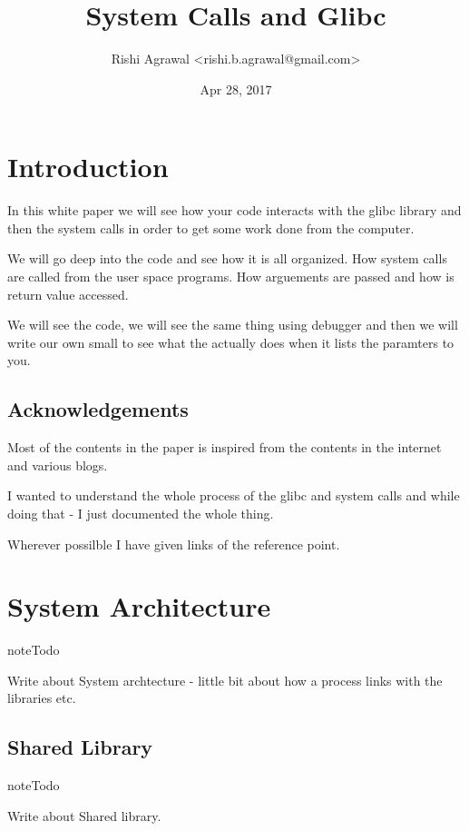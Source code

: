\documentclass[letterpaper,10pt,english]{sphinxmanual}
\title{System Calls and Glibc}
\date{Apr 28, 2017}
\author{Rishi Agrawal <rishi.b.agrawal@gmail.com>}
\begin{document}
\maketitle
\sphinxtableofcontents
{}\label{\detokenize{index::doc}}



\chapter{Introduction}
\label{\detokenize{01_introduction:introduction}}\label{\detokenize{01_introduction::doc}}\label{\detokenize{01_introduction:system-call-layer}}
In this white paper we will see how your code interacts with the glibc library and
then the system calls in order to get some work done from the computer.

We will go deep into the code and see how it is all organized. How system calls
are called from the user space programs.  How arguements are passed and how is
return value accessed.

We will see the code, we will see the same thing using debugger and then we
will write our own small  to see what the   actually does when
it lists the paramters to you.


\section{Acknowledgements}
\label{\detokenize{01_introduction:acknowledgements}}
Most of the contents in the paper is inspired from the contents in the internet
and various blogs.

I wanted to understand the whole process of the glibc and system calls and
while doing that - I just documented the whole thing.

Wherever possilble I have given links of the reference point.


\chapter{System Architecture}
\label{\detokenize{02_system_calls:system-architecture}}\label{\detokenize{02_system_calls::doc}}
\begin{sphinxadmonition}{note}{Todo}

Write about System archtecture - little bit about how a process links with the libraries etc.
\end{sphinxadmonition}


\section{Shared Library}
\label{\detokenize{02_system_calls:shared-library}}
\begin{sphinxadmonition}{note}{Todo}

Write about Shared library.
\end{sphinxadmonition}
\end{document}
